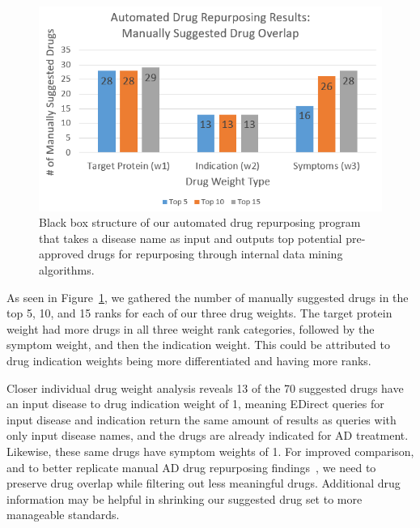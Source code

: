 \documentclass{IEEEtran}
\begin{document}
			\begin{figure}[h]
				\centering
				\includegraphics[width=\linewidth]{weightsfig}
				\caption{\footnotesize Black box structure of our automated drug repurposing program that takes a disease name as input and outputs top potential pre-approved drugs for repurposing through internal data mining algorithms.}
				\label{weightsfig}
			\end{figure} 
	
	\noindent As seen in Figure~\ref{weightsfig}, we gathered the number of manually suggested drugs in the top 5, 10, and 15 ranks for each of our three drug weights.  The target protein weight had more drugs in all three weight rank categories, followed by the symptom weight, and then the indication weight.  This could be attributed to drug indication weights being more differentiated and having more ranks.
	
	Closer individual drug weight analysis reveals 13 of the 70 suggested drugs have an input disease to drug indication weight of 1, meaning EDirect queries for input disease and indication return the same amount of results as queries with only input disease names, and the drugs are already indicated for AD treatment.  Likewise, these same drugs have symptom weights of 1.  For improved comparison, and to better replicate manual AD drug repurposing findings~\cite{zhang16}, we need to preserve drug overlap while filtering out less meaningful drugs.  Additional drug information may be helpful in shrinking our suggested drug set to more manageable standards.
\end{document}
